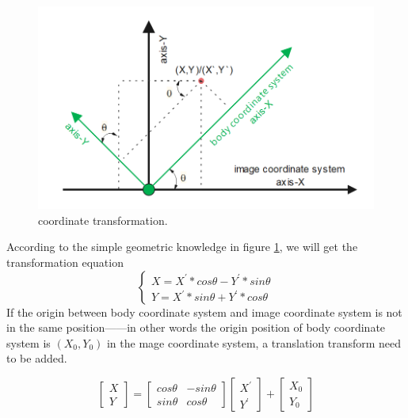 \begin{enumerate}
    \begin{figure}[thb]
        \centering
        \includegraphics[width=1\textwidth]{images/PathPlaningRotationMarix.png}
        \caption[coordinate transformation]{coordinate transformation.}\label{transformation}
    \end{figure}
    
    According to the simple geometric knowledge in figure \ref{transformation}, we will get the transformation equation
    \begin{equation}
        \left\{\begin{matrix}
        X=X^{'}*cos\theta -Y^{'}*sin\theta\\Y=X^{'}*sin\theta +Y^{'}*cos\theta \label{con:rotation1}
        \end{matrix}\right.
    \end{equation}
    If the origin between body coordinate system and image coordinate system is not in the same position——in other words the origin position of body coordinate system is $(X_{0},Y_{0})$ in the mage coordinate system, a translation transform need to be added.
    
    \begin{equation}
    \begin{bmatrix}
    X \\Y
    \end{bmatrix}
    = 
    \begin{bmatrix}
    cos\theta & -sin\theta \\sin\theta & cos\theta
    \end{bmatrix} 
    \begin{bmatrix}
    X^{'}\\Y^{'}
    \end{bmatrix} 
    +\begin{bmatrix}
    X_{0}\\Y_{0}
    \end{bmatrix}  
    \end{equation}


\end{enumerate}
